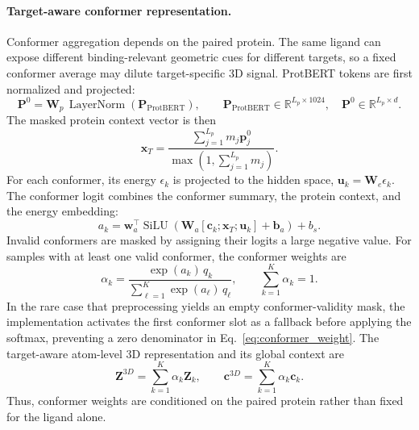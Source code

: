\paragraph{Target-aware conformer representation.}
Conformer aggregation depends on the paired protein. The same ligand can expose
different binding-relevant geometric cues for different targets, so a fixed
conformer average may dilute target-specific 3D signal. ProtBERT tokens are
first normalized and projected:
\begin{equation}
  \mathbf{P}^{0} =
\mathbf{W}_p\,\operatorname{LayerNorm}(\mathbf{P}_{\mathrm{ProtBERT}}),
  \qquad
  \mathbf{P}_{\mathrm{ProtBERT}}\in\mathbb{R}^{L_p\times 1024},
  \quad
  \mathbf{P}^{0}\in\mathbb{R}^{L_p\times d}.
  \label{eq:protein_seed_projection}
\end{equation}
The masked protein context vector is then
\begin{equation}
  \mathbf{x}_T =
  \frac{\sum_{j=1}^{L_p}m_j\mathbf{p}^{0}_j}
       {\max(1,\sum_{j=1}^{L_p}m_j)}.
  \label{eq:protein_context}
\end{equation}
For each conformer, its energy $\epsilon_k$ is projected to the hidden space,
$\mathbf{u}_k=\mathbf{W}_{e}\epsilon_k$. The conformer logit combines the
conformer summary, the protein context, and the energy embedding:
\begin{equation}
  a_k =
  \mathbf{w}_{a}^{\top}
  \operatorname{SiLU}
  \left(
    \mathbf{W}_{a}
    [\mathbf{c}_k;\mathbf{x}_T;\mathbf{u}_k]
    +\mathbf{b}_{a}
  \right)
  + b_s.
  \label{eq:conformer_score}
\end{equation}
Invalid conformers are masked by assigning their logits a large negative value.
For samples with at least one valid conformer, the conformer weights are
\begin{equation}
  \alpha_k =
  \frac{\exp(a_k)\,q_k}
       {\sum_{\ell=1}^{K}\exp(a_{\ell})\,q_{\ell}},
  \qquad
  \sum_{k=1}^{K}\alpha_k=1.
  \label{eq:conformer_weight}
\end{equation}
In the rare case that preprocessing yields an empty conformer-validity mask, the
implementation activates the first conformer slot as a fallback before applying
the softmax, preventing a zero denominator in Eq.~\ref{eq:conformer_weight}.
The target-aware atom-level 3D representation and its global context are
\begin{equation}
  \mathbf{Z}^{3D}
  =
  \sum_{k=1}^{K}\alpha_k\mathbf{Z}_k,
  \qquad
  \mathbf{c}^{3D}
  =
  \sum_{k=1}^{K}\alpha_k\mathbf{c}_k.
  \label{eq:target_aware_3d}
\end{equation}
Thus, conformer weights are conditioned on the paired protein rather than fixed
for the ligand alone.

